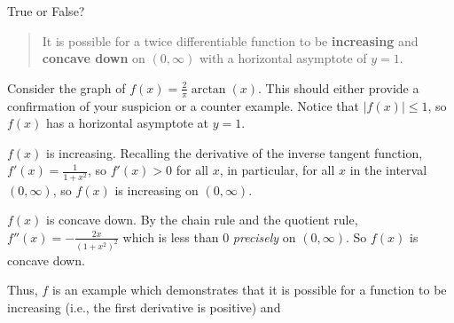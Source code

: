 \documentclass{ximera}
\author{Gregory Hartman \and Matthew Carr}
\begin{document}
\begin{exercise}




True or False?
\begin{quote}
It is possible for a twice differentiable function to be \textbf{increasing} and \textbf{concave down} on $(0,\infty)$ with a horizontal asymptote of $y=1$.
\end{quote}
\begin{prompt}
\begin{multipleChoice}
\end{multipleChoice}
\end{prompt}

\begin{hint}
Consider the graph of $f(x)=\frac{2}{\pi}\arctan(x)$. This should either provide a confirmation of your suspicion or a counter example. Notice that $\left|f(x)\right|\le1$, so $f(x)$ has a horizontal asymptote at $y=1$.
\end{hint}
\begin{hint}
$f(x)$ is increasing. Recalling the derivative of the inverse tangent function, $f'(x)=\frac{1}{1+x^2}$, so $f'(x)>0$ for all $x$, in particular, for all $x$ in the interval $(0,\infty)$, so $f(x)$ is increasing on $(0,\infty)$.
\end{hint}

\begin{hint}
$f(x)$ is concave down. By the chain rule and the quotient rule, $f''(x)=-\frac{2x}{(1+x^2)^2}$ which is less than $0$ \emph{precisely} on $(0,\infty)$. So $f(x)$ is concave down.

Thus, $f$ is an example which demonstrates that it is possible for a function to be increasing (i.e., the first derivative is positive) and 
\end{hint}

\end{exercise}
\end{document}
